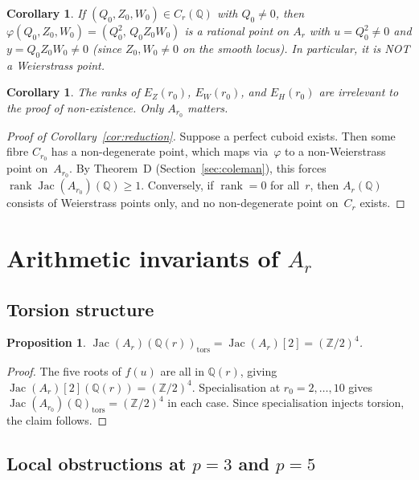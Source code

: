 \documentclass[11pt]{amsart}
\theoremstyle{plain}
\newtheorem{proposition}[theorem]{Proposition}
\newtheorem{corollary}[theorem]{Corollary}
\theoremstyle{definition}
\theoremstyle{remark}
\newcommand{\ZZ}{\mathbb{Z}}
\newcommand{\QQ}{\mathbb{Q}}
\newcommand{\Jac}{\operatorname{Jac}}
\newcommand{\rank}{\operatorname{rank}}
\begin{document}
\begin{corollary}\label{cor:nondegen}
If $(Q_0,Z_0,W_0)\in C_r(\QQ)$ with $Q_0\ne 0$, then
$\varphi(Q_0,Z_0,W_0)=(Q_0^2,\,Q_0 Z_0 W_0)$ is a rational point on $A_r$ with
$u=Q_0^2\ne 0$ and $y=Q_0 Z_0 W_0\ne 0$ (since $Z_0,W_0\ne 0$ on the
smooth locus).  In particular, it is NOT a Weierstrass point.
\end{corollary}

\begin{corollary}\label{cor:irrelevant}
The ranks of $E_Z(r_0)$, $E_W(r_0)$, and $E_H(r_0)$ are irrelevant
to the proof of non-existence.  Only $A_{r_0}$ matters.
\end{corollary}

\begin{proof}[Proof of Corollary~\ref{cor:reduction}]
Suppose a perfect cuboid exists.  Then some fibre $C_{r_0}$ has a non-degenerate
point, which maps via~$\varphi$ to a non-Weierstrass point on~$A_{r_0}$.
By Theorem~D (Section~\ref{sec:coleman}), this forces $\rank\Jac(A_{r_0})(\QQ)\ge 1$.
Conversely, if $\rank=0$ for all~$r$, then $A_r(\QQ)$ consists of Weierstrass
points only, and no non-degenerate point on~$C_r$ exists.
\end{proof}

\section{Arithmetic invariants of $A_r$}\label{sec:arithmetic}

\subsection{Torsion structure}\label{ssec:torsion}

\begin{proposition}\label{prop:torsion}
$\Jac(A_r)(\QQ(r))_{\mathrm{tors}} = \Jac(A_r)[2] = (\ZZ/2)^4$.
\end{proposition}

\begin{proof}
The five roots of $f(u)$ are all in $\QQ(r)$, giving
$\Jac(A_r)[2](\QQ(r))=(\ZZ/2)^4$.
Specialisation at $r_0=2,\dots,10$ gives
$\Jac(A_{r_0})(\QQ)_{\mathrm{tors}}=(\ZZ/2)^4$ in each case.
Since specialisation injects torsion, the claim follows.
\end{proof}

\subsection{Local obstructions at $p=3$ and $p=5$}\label{ssec:local}
\end{document}
